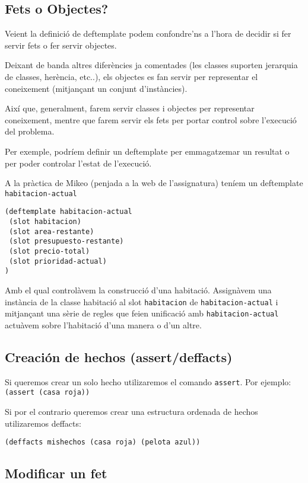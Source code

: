 \documentclass[11pt,svgnames]{scrbook}
\begin{document}
\subsection{Fets o Objectes?}


Veient la definició de deftemplate podem confondre'ns a l'hora de decidir si fer servir fets o fer servir objectes.

Deixant de banda altres diferències ja comentades (les classes suporten
jerarquia de classes, herència, etc..), els objectes es fan servir per
representar el coneixement (mitjançant un conjunt d'instàncies).

Així que, generalment, farem servir classes i objectes per representar coneixement, mentre que farem servir els fets per portar control sobre l'execució del problema.

Per exemple, podríem definir un deftemplate per emmagatzemar un resultat o per poder controlar l'estat de l'execució.

A la pràctica de Mikeo (penjada a la web de l'assignatura) teníem un deftemplate \texttt{habitacion-actual}

\begin{verbatim}
(deftemplate habitacion-actual
 (slot habitacion)
 (slot area-restante)
 (slot presupuesto-restante)
 (slot precio-total)
 (slot prioridad-actual)
)
\end{verbatim}

Amb el qual controlàvem la construcció d'una habitació. Assignàvem una instància de la classe
habitació al slot \texttt{habitacion} de \texttt{habitacion-actual} i mitjançant una sèrie de regles
que feien unificació amb \texttt{habitacion-actual} actuàvem sobre l'habitació d'una manera o d'un
altre.

\subsection{Creación de hechos (assert/deffacts)}

Si queremos crear un solo hecho utilizaremos el comando \texttt{assert}. Por ejemplo:
\texttt{(assert (casa roja))}

Si por el contrario queremos crear una estructura ordenada de hechos utilizaremos deffacts:
\medskip

\texttt{(deffacts mishechos (casa roja) (pelota azul))}




\subsection{Modificar un fet}
\end{document}
